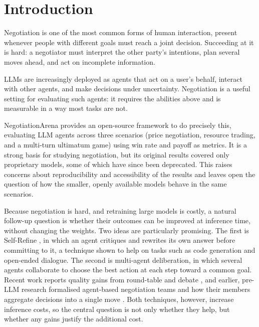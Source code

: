 
\chapter{Introduction} \label{chap:intro}

Negotiation is one of the most common forms of human interaction, present whenever people with different goals must reach a joint decision. Succeeding at it is hard: a negotiator must interpret the other party's intentions, plan several moves ahead, and act on incomplete information. 

\acp{LLM} are increasingly deployed as agents that act on a user's behalf, interact with other agents, and make decisions under uncertainty. Negotiation is a useful setting for evaluating such agents: it requires the abilities above and is measurable in a way most tasks are not.

NegotiationArena \parencite{bianchi_how_2024} provides an open-source framework to do precisely this, evaluating \ac{LLM} agents across three scenarios (price negotiation, resource trading, and a multi-turn ultimatum game) using win rate and payoff as metrics. It is a strong basis for studying negotiation, but its original results covered only proprietary models, some of which have since been deprecated. This raises concerns about reproducibility and accessibility of the results and leaves open the question of how the smaller, openly available models behave in the same scenarios.

Because negotiation is hard, and retraining large models is costly, a natural follow-up question is whether their outcomes can be improved at inference time, without changing the weights. Two ideas are particularly promising. The first is Self-Refine \parencite{madaan_self-refine_2023}, in which an agent critiques and rewrites its own answer before committing to it, a technique shown to help on tasks such as code generation and open-ended dialogue. The second is multi-agent deliberation, in which several agents collaborate to choose the best action at each step toward a common goal. Recent work reports quality gains from round-table \parencite{chen2024reconcileroundtableconferenceimproves} and debate \parencite{3692070.3692537}, and earlier, pre-\ac{LLM} research formalised agent-based negotiation teams and how their members aggregate decisions into a single move \parencite{S_nchez_Anguix_2013}. Both techniques, however, increase inference costs, so the central question is not only whether they help, but whether any gains justify the additional cost.

